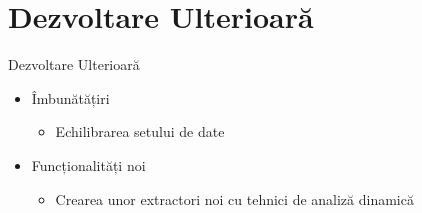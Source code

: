 \section{Dezvoltare Ulterioară}

\begin{frame}{Dezvoltare Ulterioară} \pause
	\begin{itemize}
		\item Îmbunătățiri \pause
		\begin{itemize}
		    \item Echilibrarea setului de date \pause
		\end{itemize}
		\item Funcționalități noi \pause
		\begin{itemize}
		    \item Crearea unor extractori noi cu tehnici de analiză dinamică
		\end{itemize}
	\end{itemize}
\end{frame}